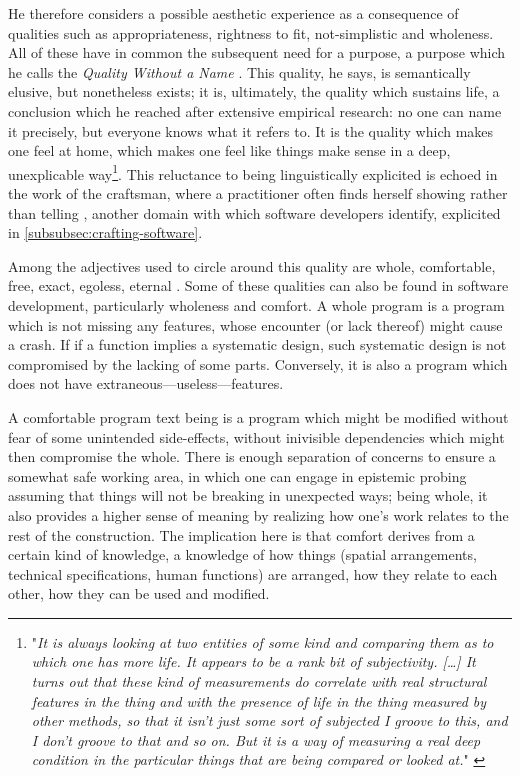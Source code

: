 He therefore considers a possible aesthetic experience as a consequence of qualities such as appropriateness, rightness to fit, not-simplistic and wholeness. All of these have in common the subsequent need for a purpose, a purpose which he calls the \emph{Quality Without a Name} \citep{alexander_timeless_1979}. This quality, he says, is semantically elusive, but nonetheless exists; it is, ultimately, the quality which sustains life, a conclusion which he reached after extensive empirical research: no one can name it precisely, but everyone knows what it refers to. It is the quality which makes one feel at home, which makes one feel like things make sense in a deep, unexplicable way\footnote{"\emph{It is always looking at two entities of some kind and comparing them as to which one has more life. It appears to be a rank bit of subjectivity. [\dots] It turns out that these kind of measurements do correlate with real structural features in the thing and with the presence of life in the thing measured by other methods, so that it isn't just some sort of subjected I groove to this, and I don't groove to that and so on. But it is a way of measuring a real deep condition in the particular things that are being compared or looked at.}" \citep{alexander_keynote_1996}}. This reluctance to being linguistically explicited is echoed in the work of the craftsman, where a practitioner often finds herself showing rather than telling \citep{pye_nature_2008}, another domain with which software developers identify, explicited in \ref{subsubsec:crafting-software}.

Among the adjectives used to circle around this quality are whole, comfortable, free, exact, egoless, eternal \citep{alexander_timeless_1979}. Some of these qualities can also be found in software development, particularly wholeness and comfort. A whole program is a program which is not missing any features, whose encounter (or lack thereof) might cause a crash. If if a function implies a systematic design, such systematic design is not compromised by the lacking of some parts. Conversely, it is also a program which does not have extraneous—useless—features.

A comfortable program text being is a program which might be modified without fear of some unintended side-effects, without inivisible dependencies which might then compromise the whole. There is enough separation of concerns to ensure a somewhat safe working area, in which one can engage in epistemic probing assuming that things will not be breaking in unexpected ways; being whole, it also provides a higher sense of meaning by realizing how one's work relates to the rest of the construction. The implication here is that comfort derives from a certain kind of knowledge, a knowledge of how things (spatial arrangements, technical specifications, human functions) are arranged, how they relate to each other, how they can be used and modified.

